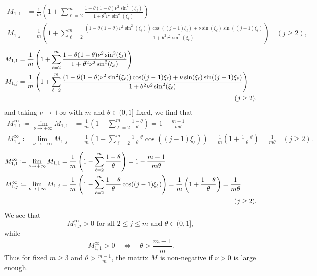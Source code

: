 \documentclass[a4paper]{article}
\newcommand{\te}{\theta}
\begin{document}
\begin{description}[style=unboxed,leftmargin=0cm]
\ifjournal
\begin{align*}
	M_{1,1} & = \frac{1}{m} \left(1 + \sum_{\ell=2}^{m} \frac{1-\theta(1-\theta)\nu^2\sin^2(\xi_\ell)}
		{1+\theta^2\nu^2\sin^2(\xi_\ell)}\right) \\
	M_{1,j} & = \frac{1}{m} \left(1 + \sum_{\ell=2}^{m} \frac{(1-\theta(1-\theta)\nu^2\sin^2(\xi_\ell))
		\cos((j-1)\xi_\ell) + \nu \sin(\xi_\ell)\sin((j-1)\xi_\ell)}{1+\theta^2\nu^2 \sin^2(\xi_\ell)}
		\right) \quad (j\ge 2),
\end{align*}
\else
\begin{align*}
	M_{1,1} & = \frac{1}{m} \left(1 + \sum_{\ell=2}^{m} \frac{1-\theta(1-\theta)\nu^2\sin^2(\xi_\ell)}
		{1+\theta^2\nu^2\sin^2(\xi_\ell)}\right) \\
	M_{1,j} & = \frac{1}{m} \left(1 + \sum_{\ell=2}^{m} \frac{(1-\theta(1-\theta)\nu^2\sin^2(\xi_\ell))
		\cos((j-1)\xi_\ell) + \nu \sin(\xi_\ell)\sin((j-1)\xi_\ell)}{1+\theta^2\nu^2 \sin^2(\xi_\ell)}
		\right) \\ && \hspace*{-30pt} (j \ge 2).
\end{align*}
\fi
and taking $\nu \to +\infty$ with $m$ and $\te\in(0,1]$ fixed, we find that
\ifjournal
\begin{align*}
    M_{1,1}^\infty \coloneqq \lim_{\nu \to +\infty} M_{1,1} & = \frac{1}{m} \left(1 - \sum_{\ell=2}^m \frac{1-\theta}{\theta}\right) =  1-\frac{m-1}{m\theta} \\
    M_{1,j}^\infty \coloneqq \lim_{\nu \to +\infty} M_{1,j} & = \frac{1}{m} \left(1 - \sum_{\ell=2}^m \frac{1-\theta}{\theta}\cos((j-1)\xi_\ell)\right) = \frac{1}{m} \left(1+\frac{1-\theta}{\theta}\right) = \frac{1}{m\theta} \quad (j \ge 2).
\end{align*}
\else
\begin{align*}
    M_{1,1}^\infty \coloneqq \lim_{\nu \to +\infty} M_{1,1} & = \frac{1}{m} \left(1 - \sum_{\ell=2}^m \frac{1-\theta}{\theta}\right) =  1-\frac{m-1}{m\theta} \\
    M_{1,j}^\infty \coloneqq \lim_{\nu \to +\infty} M_{1,j} & = \frac{1}{m} \left(1 - \sum_{\ell=2}^m \frac{1-\theta}{\theta}\cos((j-1)\xi_\ell)\right) = \frac{1}{m} \left(1+\frac{1-\theta}{\theta}\right) = \frac{1}{m\theta} \\ && \hspace*{-20pt} (j \ge 2).
\end{align*}
\fi
We see that
\[M_{1,j}^\infty>0 \text{ for all } 2\le j\le m \text{ and } \te\in(0,1],
\]
 while 
\[M_{1,1}^\infty>0 \quad\Longleftrightarrow\quad \theta>\frac{m-1}{m}.
\]
Thus for fixed $m\ge 3$ and $\theta>\frac{m-1}{m}$, the matrix $M$ is non-negative 
if $\nu>0$ is large enough.


\end{description}
\end{document}
